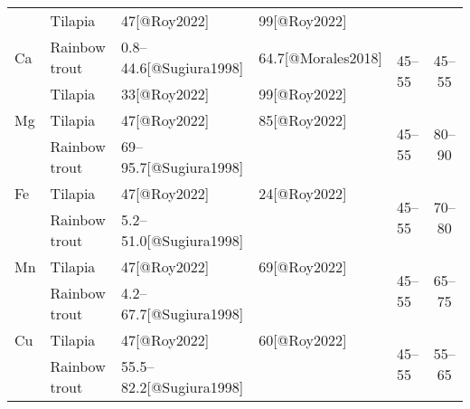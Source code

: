 \begin{table}
\begin{threeparttable}
\begin{tabularx}{\textwidth}{XlXXXc}
    
    & Tilapia
    & \SI{47}{\p}\tnote{†}[@Roy2022]
    & \SI{99}{\p}[@Roy2022]
    &
    &
    \\
    
    \addlinespace
    
    Ca
    & Rainbow trout
    & \SIrange{0.8}{44.6}{\p}[@Sugiura1998]
    & \SI{64.7}{\p}[@Morales2018]
    & \multirow{2}{*}{\SIrange{45}{55}{\p}}
    & \multirow{2}{*}{\SIrange{45}{55}{\p}}
    \\
    
    
    & Tilapia
    & \SI{33}{\p}[@Roy2022]
    & \SI{99}{\p}[@Roy2022]
    &
    &
    \\
    
    \addlinespace
    
    Mg
    & Tilapia
    & \SI{47}{\p}\tnote{†}[@Roy2022]
    & \SI{85}{\p}[@Roy2022]
    & \multirow{2}{*}{\SIrange{45}{55}{\p}}
    & \multirow{2}{*}{\SIrange{80}{90}{\p}}
    \\
    
    
    & Rainbow trout
    & \SIrange{69}{95.7}{\p}[@Sugiura1998]
    &
    &
    &
    \\
    
    \addlinespace
    
    Fe
    & Tilapia
    & \SI{47}{\p}\tnote{†}[@Roy2022]
    & \SI{24}{\p}[@Roy2022]
    & \multirow{2}{*}{\SIrange{45}{55}{\p}}
    & \multirow{2}{*}{\SIrange{70}{80}{\p}}
    \\
    
    
    & Rainbow trout
    & \SIrange{5.2}{51.0}{\p}[@Sugiura1998]
    &
    &
    &
    \\
    
    \addlinespace
    
    Mn
    & Tilapia
    & \SI{47}{\p}\tnote{†}[@Roy2022]
    & \SI{69}{\p}[@Roy2022]
    & \multirow{2}{*}{\SIrange{45}{55}{\p}}
    & \multirow{2}{*}{\SIrange{65}{75}{\p}}
    \\
    
    & Rainbow trout
    & \SIrange{4.2}{67.7}{\p}[@Sugiura1998]
    &
    &
    &
    \\
    
    \addlinespace
    
    Cu
    & Tilapia
    & \SI{47}{\p}\tnote{†}[@Roy2022]
    & \SI{60}{\p}[@Roy2022]
    & \multirow{2}{*}{\SIrange{45}{55}{\p}}
    & \multirow{2}{*}{\SIrange{55}{65}{\p}}
    \\
    
    & Rainbow trout
    & \SIrange{55.5}{82.2}{\p}[@Sugiura1998]
    &
    &
    &
    \\
    

\end{tabularx}
\end{threeparttable}
\end{table}
